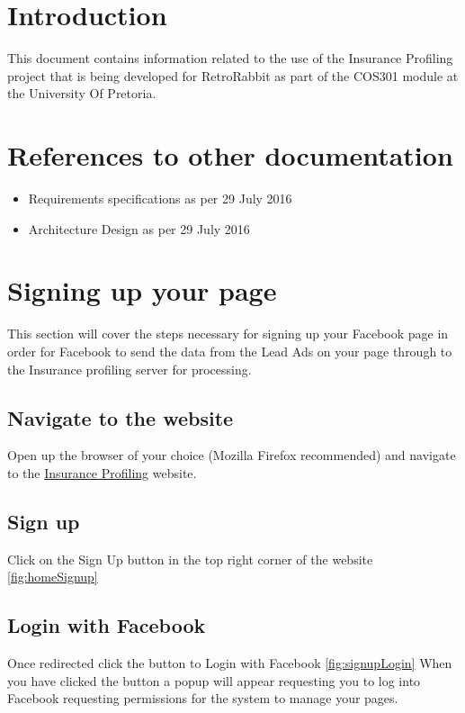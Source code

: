 \documentclass{article}
\begin{document}
	\section{Introduction}
		This document contains information related to the use of the Insurance Profiling project that is being developed for RetroRabbit as part of the COS301 module at the University Of Pretoria.

	\section{References to other documentation}
		\begin{itemize}
			\item{Requirements specifications as per 29 July 2016}
			\item{Architecture Design as per 29 July 2016}
		\end{itemize}

	\section{Signing up your page}
		This section will cover the steps necessary for signing up your Facebook page in order for Facebook to send the data from the Lead Ads on your page through to the Insurance profiling server for processing.

		\subsection{Navigate to the website}
			Open up the browser of your choice (Mozilla Firefox recommended) and navigate to the \href{https://insuranceprofiling.herokuapp.com}{Insurance Profiling} website.

		\subsection{Sign up}
			Click on the Sign Up button in the top right corner of the website\\
			\ref{fig:homeSignup}

		\subsection{Login with Facebook}
			Once redirected click the button to Login with Facebook
			\ref{fig:signupLogin}
			When you have clicked the button a popup will appear requesting you to log into Facebook requesting permissions for the system to manage your pages.
\end{document}
